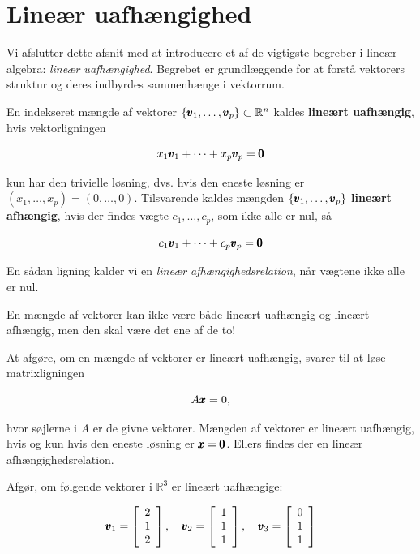 \section{Lineær uafhængighed}
Vi afslutter dette afsnit med at introducere et af de vigtigste begreber i lineær algebra: \textit{lineær uafhængighed}. Begrebet er grundlæggende for at forstå vektorers struktur og deres indbyrdes sammenhænge i vektorrum.

\begin{definition}
    En indekseret mængde af vektorer $\left\{\pmb{v}_1, \ldots, \pmb{v}_p\right\} \subset \mathbb{R}^n$ kaldes \textbf{lineært uafhængig}, hvis vektorligningen
    
    \[
    x_1 \pmb{v}_1 + \cdots + x_p \pmb{v}_p = \pmb{0}
    \]
    
    kun har den trivielle løsning, dvs. hvis den eneste løsning er $\left(x_1, \ldots, x_p\right) = (0, \ldots, 0)$. Tilsvarende kaldes mængden $\left\{\pmb{v}_1, \ldots, \pmb{v}_p\right\}$ \textbf{lineært afhængig}, hvis der findes vægte $c_1, \ldots, c_p$, som ikke alle er nul, så
    
    \[
    c_1 \pmb{v}_1 + \cdots + c_p \pmb{v}_p = \pmb{0}
    \]
    
    En sådan ligning kalder vi en \textit{lineær afhængighedsrelation}, når vægtene ikke alle er nul.
\end{definition}
    
    \begin{remark}
        En mængde af vektorer kan ikke være både lineært uafhængig og lineært afhængig, men den skal være det ene af de to!
    \end{remark}

    At afgøre, om en mængde af vektorer er lineært uafhængig, svarer til at løse matrixligningen

    \[
    A \pmb{x}=0,
    \]

hvor søjlerne i $A$ er de givne vektorer. Mængden af vektorer er lineært uafhængig, hvis og kun hvis den eneste løsning er $\pmb{x}=\pmb{0}$. Ellers findes der en lineær afhængighedsrelation.

    \begin{example}
        Afgør, om følgende vektorer i $\mathbb{R}^3$ er lineært uafhængige:

        \[
        \pmb{v}_1 = \left[\begin{array}{l}
        2 \\
        1 \\
        2
        \end{array}\right], \quad \pmb{v}_2 = \left[\begin{array}{l}
        1 \\
        1 \\
        1
        \end{array}\right], \quad \pmb{v}_3 = \left[\begin{array}{l}
        0 \\
        1 \\
        1
        \end{array}\right]
        \]
    \end{example}

